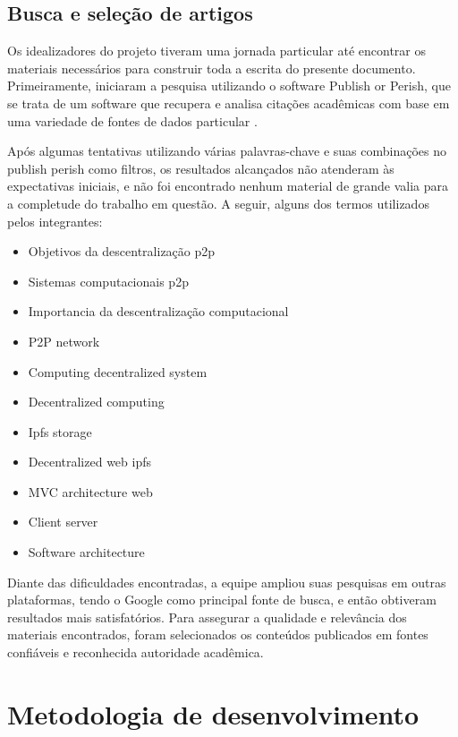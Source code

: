 \subsection{Busca e seleção de artigos}
Os idealizadores do projeto tiveram uma jornada particular até encontrar os materiais necessários para construir toda a escrita do presente documento. Primeiramente, iniciaram a pesquisa utilizando o software Publish or Perish, que se trata de um software que recupera e analisa citações acadêmicas com base em uma variedade de fontes de dados particular \cite{harzing2025publish}.

Após algumas tentativas utilizando várias palavras-chave e suas combinações no publish perish como filtros, os resultados alcançados não atenderam às expectativas iniciais, e não foi encontrado nenhum material de grande valia para a completude do trabalho em questão. A seguir, alguns dos termos utilizados pelos integrantes: 

\begin{itemize}
    \item Objetivos da descentralização p2p
    \item Sistemas computacionais p2p
    \item Importancia da descentralização computacional
    \item P2P network
    \item Computing decentralized system
    \item Decentralized computing
    \item Ipfs storage
    \item Decentralized web ipfs
    \item MVC architecture web
    \item Client server
    \item Software architecture
\end{itemize}

Diante das dificuldades encontradas, a equipe ampliou suas pesquisas em outras plataformas, tendo o Google como principal fonte de busca, e então obtiveram resultados mais satisfatórios. Para assegurar a qualidade e relevância dos materiais encontrados, foram selecionados os conteúdos publicados em fontes confiáveis e reconhecida autoridade acadêmica.

\section{Metodologia de desenvolvimento}
